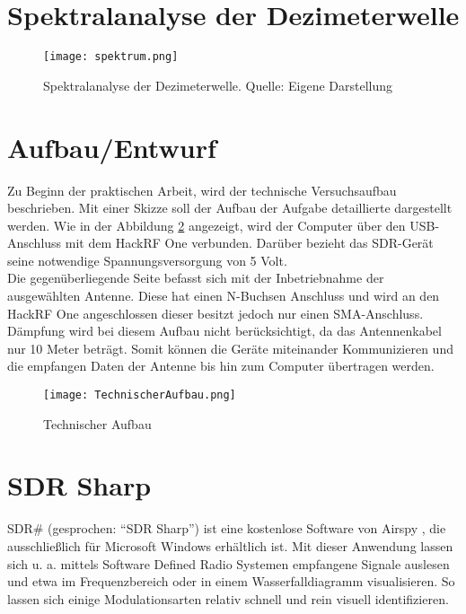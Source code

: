 \section{Spektralanalyse der Dezimeterwelle}
\begin{figure}[ht]
	\centering
	\texttt{[image: spektrum.png]}
	\caption[Spektralanalyse der Dezimeterwelle]{Spektralanalyse der Dezimeterwelle. Quelle: Eigene Darstellung} 
	\label{spektralanalyse}
\end{figure}


\section{Aufbau/Entwurf}
Zu Beginn der praktischen Arbeit, wird der technische Versuchsaufbau beschrieben. Mit einer Skizze soll der Aufbau der Aufgabe detaillierte dargestellt werden. Wie in der Abbildung \ref{Technischer Aufbau} angezeigt, wird der Computer über den USB-Anschluss mit dem HackRF One verbunden. Darüber bezieht das SDR-Gerät seine notwendige Spannungsversorgung von 5 Volt.\\
Die gegenüberliegende Seite befasst sich mit der Inbetriebnahme der ausgewählten Antenne. Diese hat einen N-Buchsen Anschluss und wird an den HackRF One angeschlossen dieser besitzt jedoch nur einen SMA-Anschluss. Dämpfung wird bei diesem Aufbau nicht berücksichtigt, da das Antennenkabel nur 10 Meter beträgt. Somit können die Geräte miteinander Kommunizieren und die empfangen Daten der Antenne bis hin zum Computer übertragen werden.  
\begin{figure}[H]
	\centering
	\texttt{[image: TechnischerAufbau.png]}
	\caption[Technischer Aufbau]{Technischer Aufbau} 
	\label{Technischer Aufbau}
\end{figure}

\section{SDR Sharp}
SDR\# (gesprochen: \enquote{SDR Sharp}) ist eine kostenlose Software von Airspy \cite{airspy:2018}, die ausschließlich für Microsoft Windows erhältlich ist. Mit dieser Anwendung lassen sich u. a. mittels Software Defined Radio Systemen empfangene Signale auslesen und etwa im Frequenzbereich oder in einem Wasserfalldiagramm visualisieren.
So lassen sich einige Modulationsarten relativ schnell und rein visuell identifizieren.

